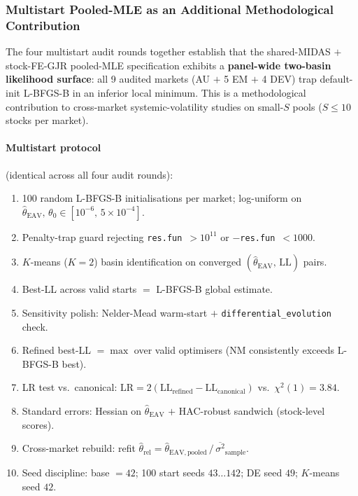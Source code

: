 \documentclass[12pt,a4paper]{article}
\begin{document}
\subsubsection{Multistart Pooled-MLE as an Additional Methodological Contribution}
\label{sec:multistart_method}

The four multistart audit rounds together establish that the shared-MIDAS $+$ stock-FE-GJR
pooled-MLE specification exhibits a \textbf{panel-wide two-basin likelihood
surface}: all 9 audited markets (AU $+$ 5 EM $+$ 4 DEV) trap default-init L-BFGS-B in an
inferior local minimum. This is a methodological contribution to cross-market
systemic-volatility studies on small-$S$ pools ($S \leq 10$ stocks per market).

\paragraph{Multistart protocol} (identical across all four audit rounds):
\begin{enumerate}[label=\arabic*.]
\item 100 random L-BFGS-B initialisations per market; log-uniform on
  $\hat{\theta}_{\mathrm{EAV}},\, \theta_0 \in [10^{-6},\, 5 \times 10^{-4}]$.
\item Penalty-trap guard rejecting \texttt{res.fun}~$> 10^{11}$ or
  $-$\texttt{res.fun}~$< 1000$.
\item $K$-means ($K = 2$) basin identification on converged
  $(\hat{\theta}_{\mathrm{EAV}},\,\mathrm{LL})$ pairs.
\item Best-LL across valid starts $=$ L-BFGS-B global estimate.
\item Sensitivity polish: Nelder-Mead warm-start $+$ \texttt{differential\_evolution} check.
\item Refined best-LL $= \max$ over valid optimisers (NM consistently exceeds L-BFGS-B best).
\item LR test vs.\ canonical: $\mathrm{LR} = 2(\mathrm{LL}_{\mathrm{refined}}
  - \mathrm{LL}_{\mathrm{canonical}})$ vs.\ $\chi^2(1) = 3.84$.
\item Standard errors: Hessian on $\hat{\theta}_{\mathrm{EAV}}$ $+$ HAC-robust sandwich
  (stock-level scores).
\item Cross-market rebuild: refit
  $\hat{\theta}_{\mathrm{rel}} = \hat{\theta}_{\mathrm{EAV,pooled}}\,/\,\overline{\sigma^2}_{\mathrm{sample}}$.
\item Seed discipline: base $= 42$; 100 start seeds $43\ldots 142$; DE seed $49$;
  $K$-means seed $42$.
\end{enumerate}
\end{document}
